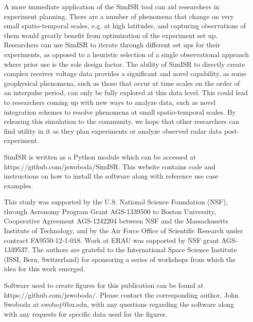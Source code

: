 \documentclass[draft,ras]{agutex}
\begin{document}
\begin{article}
A more immediate application of the SimISR tool can aid researchers in experiment planning. There are a number of phenomena that change on very small spatio-temporal scales, e.g. at high latitudes, and capturing observations of them would greatly benefit from optimization of the experiment set up. Researchers can use SimISR to iterate through different set ups for their experiments, as opposed to a heuristic selection of a single observational approach where prior use is the sole design factor. The ability of SimISR to directly create complex receiver voltage data provides a significant and novel capability, as some geophysical phenomena, such as those that occur at time scales on the order of an interpulse period, can only be fully explored at this data level. This could lead to researchers coming up with new ways to analyze data, such as novel integration schemes to resolve phenomena at small spatio-temporal scales.
By releasing this simulation to the community, we hope that other researchers can find utility in it as they plan experiments or analyze observed radar data post-experiment.

SimISR is written as a Python module which can be accessed at https://github.com/jswoboda/SimISR. This website contains code and instructions on how to install the software along with reference use case examples.
\begin{acknowledgments}
This study was supported by the U.S. National Science Foundation (NSF), through Aeronomy Program Grant AGS-1339500 to Boston University, Cooperative Agreement AGS-1242204 between NSF and the Massachusetts Institute of Technology, and by the Air Force Office of Scientific Research under contract FA9550-12-1-018.   Work at ERAU was supported by NSF grant AGS-1339537.  The authors are grateful to the International Space Science Institute (ISSI, Bern, Switzerland) for sponsoring a series of workshops from which the idea for this work emerged. 

Software used to create figures for this publication can be found at https://github.com/jswoboda/. Please contact the corresponding author, John Swoboda at swoboj@bu.edu, with any questions regarding the software along with any requests for specific data used for the figures. \end{acknowledgments}




\end{article}
\end{document}
